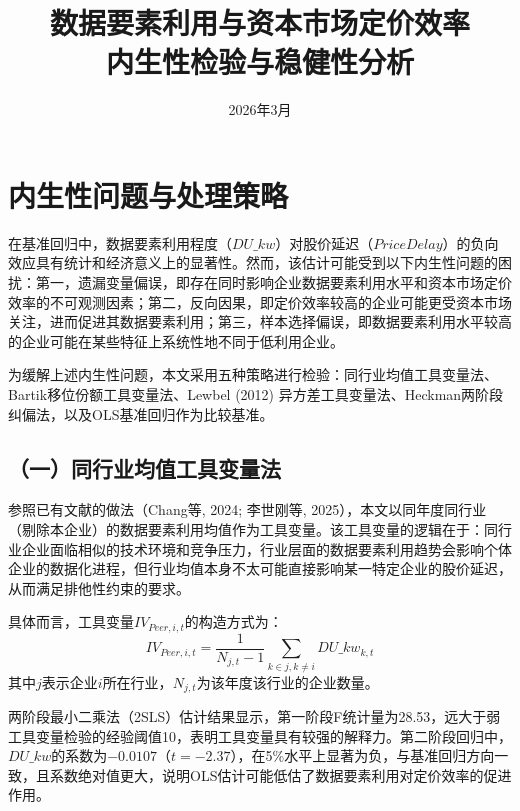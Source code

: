\documentclass[11pt,a4paper]{article}
\title{{\hei\Large 数据要素利用与资本市场定价效率} \\[8pt]
{\large 内生性检验与稳健性分析}}
\author{}
\date{2026年3月}
\begin{document}
\maketitle
\thispagestyle{fancy}

\section*{内生性问题与处理策略}

在基准回归中，数据要素利用程度（$DU\_kw$）对股价延迟（$PriceDelay$）的负向效应具有统计和经济意义上的显著性。然而，该估计可能受到以下内生性问题的困扰：第一，遗漏变量偏误，即存在同时影响企业数据要素利用水平和资本市场定价效率的不可观测因素；第二，反向因果，即定价效率较高的企业可能更受资本市场关注，进而促进其数据要素利用；第三，样本选择偏误，即数据要素利用水平较高的企业可能在某些特征上系统性地不同于低利用企业。

为缓解上述内生性问题，本文采用五种策略进行检验：同行业均值工具变量法、Bartik移位份额工具变量法、Lewbel (2012) 异方差工具变量法、Heckman两阶段纠偏法，以及OLS基准回归作为比较基准。

\subsection*{（一）同行业均值工具变量法}

参照已有文献的做法（Chang等, 2024; 李世刚等, 2025），本文以同年度同行业（剔除本企业）的数据要素利用均值作为工具变量。该工具变量的逻辑在于：同行业企业面临相似的技术环境和竞争压力，行业层面的数据要素利用趋势会影响个体企业的数据化进程，但行业均值本身不太可能直接影响某一特定企业的股价延迟，从而满足排他性约束的要求。

具体而言，工具变量$IV_{Peer,i,t}$的构造方式为：
\begin{equation}
IV_{Peer,i,t} = \frac{1}{N_{j,t}-1}\sum_{k \in j, k \neq i} DU\_kw_{k,t}
\end{equation}
其中$j$表示企业$i$所在行业，$N_{j,t}$为该年度该行业的企业数量。

两阶段最小二乘法（2SLS）估计结果显示，第一阶段F统计量为28.53，远大于弱工具变量检验的经验阈值10，表明工具变量具有较强的解释力。第二阶段回归中，$DU\_kw$的系数为$-0.0107$（$t=-2.37$），在5\%水平上显著为负，与基准回归方向一致，且系数绝对值更大，说明OLS估计可能低估了数据要素利用对定价效率的促进作用。

\end{document}
